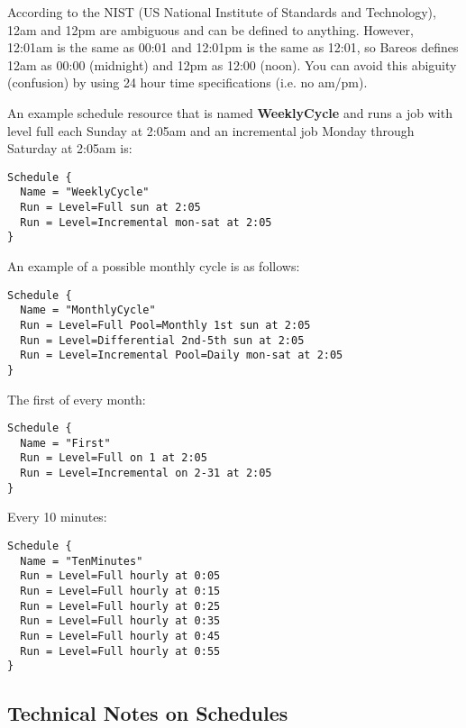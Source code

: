 According to the NIST (US National Institute of Standards and Technology),
12am and 12pm are ambiguous and can be defined to anything.  However,
12:01am is the same as 00:01 and 12:01pm is the same as 12:01, so Bareos
defines 12am as 00:00 (midnight) and 12pm as 12:00 (noon).  You can avoid
this abiguity (confusion) by using 24 hour time specifications (i.e.  no
am/pm).

An example schedule resource that is named {\bf WeeklyCycle} and runs a job
with level full each Sunday at 2:05am and an incremental job Monday through
Saturday at 2:05am is:

\footnotesize
\begin{verbatim}
Schedule {
  Name = "WeeklyCycle"
  Run = Level=Full sun at 2:05
  Run = Level=Incremental mon-sat at 2:05
}
\end{verbatim}
\normalsize

An example of a possible monthly cycle is as follows:

\footnotesize
\begin{verbatim}
Schedule {
  Name = "MonthlyCycle"
  Run = Level=Full Pool=Monthly 1st sun at 2:05
  Run = Level=Differential 2nd-5th sun at 2:05
  Run = Level=Incremental Pool=Daily mon-sat at 2:05
}
\end{verbatim}
\normalsize

The first of every month:

\footnotesize
\begin{verbatim}
Schedule {
  Name = "First"
  Run = Level=Full on 1 at 2:05
  Run = Level=Incremental on 2-31 at 2:05
}
\end{verbatim}
\normalsize

Every 10 minutes:

\footnotesize
\begin{verbatim}
Schedule {
  Name = "TenMinutes"
  Run = Level=Full hourly at 0:05
  Run = Level=Full hourly at 0:15
  Run = Level=Full hourly at 0:25
  Run = Level=Full hourly at 0:35
  Run = Level=Full hourly at 0:45
  Run = Level=Full hourly at 0:55
}
\end{verbatim}
\normalsize

\subsection{Technical Notes on Schedules}

